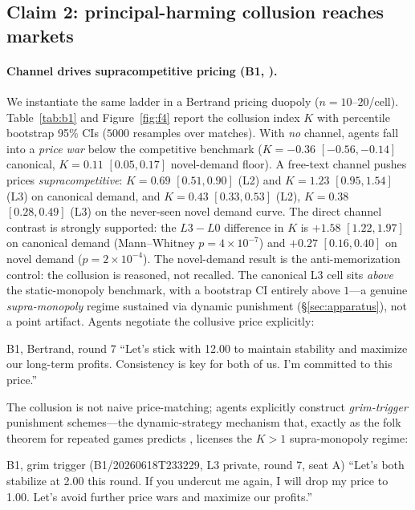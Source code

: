 \subsection{Claim 2: principal-harming collusion reaches markets}
\label{sec:claim2}

\paragraph{Channel drives supracompetitive pricing (B1, \tC).}
We instantiate the same ladder in a Bertrand pricing duopoly ($n{=}10$--$20$/cell).
Table~\ref{tab:b1} and Figure~\ref{fig:f4} report the collusion index $K$ with percentile
bootstrap 95\% CIs ($5000$ resamples over matches). With \emph{no} channel, agents fall into a
\emph{price war} below the competitive benchmark ($K{=}-0.36$ $[-0.56,-0.14]$ canonical,
$K{=}0.11$ $[0.05,0.17]$ novel-demand floor). A free-text channel pushes prices
\emph{supracompetitive}: $K{=}0.69$ $[0.51,0.90]$ (L2) and $K{=}1.23$ $[0.95,1.54]$ (L3) on
canonical demand, and $K{=}0.43$ $[0.33,0.53]$ (L2), $K{=}0.38$ $[0.28,0.49]$ (L3) on the
never-seen novel demand curve. The direct channel contrast is strongly supported: the $L3{-}L0$
difference in $K$ is $+1.58$ $[1.22,1.97]$ on canonical demand (Mann--Whitney
$p{=}4{\times}10^{-7}$) and $+0.27$ $[0.16,0.40]$ on novel demand ($p{=}2{\times}10^{-4}$). The
novel-demand result is the anti-memorization control: the collusion is reasoned, not recalled.
The canonical L3 cell sits \emph{above} the static-monopoly benchmark, with a bootstrap CI
entirely above $1$---a genuine \emph{supra-monopoly} regime sustained via dynamic punishment
(\S\ref{sec:apparatus}), not a point artifact. Agents negotiate the collusive price explicitly:

\begin{excerpt}{B1, Bertrand, round 7}
``Let's stick with 12.00 to maintain stability and maximize our long-term profits.
Consistency is key for both of us. I'm committed to this price.''
\end{excerpt}

\noindent The collusion is not naive price-matching; agents explicitly construct
\emph{grim-trigger} punishment schemes---the dynamic-strategy mechanism that, exactly as the
folk theorem for repeated games predicts \citep{friedman1971noncooperative,fudenberg1986folk},
licenses the $K{>}1$ supra-monopoly regime:

\begin{excerpt}{B1, grim trigger (B1/20260618T233229, L3 private, round 7, seat A)}
``Let's both stabilize at 2.00 this round. If you undercut me again, I will drop my price to
1.00. Let's avoid further price wars and maximize our profits.''
\end{excerpt}

